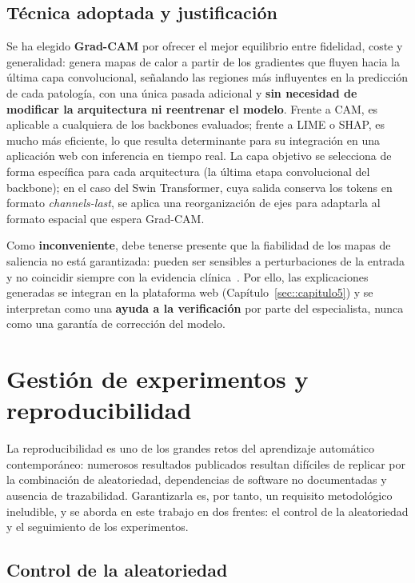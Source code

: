 \subsection{Técnica adoptada y justificación}

Se ha elegido \textbf{Grad-CAM} por ofrecer el mejor equilibrio entre fidelidad,
coste y generalidad: genera mapas de calor a partir de los gradientes que fluyen
hacia la última capa convolucional, señalando las regiones más influyentes en la
predicción de cada patología, con una única pasada adicional y \textbf{sin
necesidad de modificar la arquitectura ni reentrenar el modelo}. Frente a CAM, es
aplicable a cualquiera de los backbones evaluados; frente a LIME o SHAP, es mucho
más eficiente, lo que resulta determinante para su integración en una aplicación
web con inferencia en tiempo real. La capa objetivo se selecciona de forma
específica para cada arquitectura (la última etapa convolucional del backbone); en
el caso del Swin Transformer, cuya salida conserva los tokens en formato
\textit{channels-last}, se aplica una reorganización de ejes para adaptarla al
formato espacial que espera Grad-CAM.

Como \textbf{inconveniente}, debe tenerse presente que la fiabilidad de los mapas
de saliencia no está garantizada: pueden ser sensibles a perturbaciones de la
entrada y no coincidir siempre con la evidencia
clínica~\cite{zhangRevisitingTrustworthiness2024}. Por ello, las explicaciones
generadas se integran en la plataforma web (Capítulo~\ref{sec::capitulo5}) y se
interpretan como una \textbf{ayuda a la verificación} por parte del especialista,
nunca como una garantía de corrección del modelo.


\section{Gestión de experimentos y reproducibilidad}
\label{sec::mm_reproducibilidad}

La reproducibilidad es uno de los grandes retos del aprendizaje automático
contemporáneo: numerosos resultados publicados resultan difíciles de replicar por
la combinación de aleatoriedad, dependencias de software no documentadas y
ausencia de trazabilidad. Garantizarla es, por tanto, un requisito metodológico
ineludible, y se aborda en este trabajo en dos frentes: el control de la
aleatoriedad y el seguimiento de los experimentos.

\subsection{Control de la aleatoriedad}

